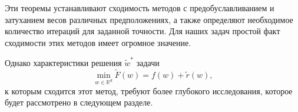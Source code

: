 Эти теоремы устанавливают сходимость методов с предобуславливанием и затуханием весов различных предположениях, а также определяют необходимое количество итераций для заданной точности. Для наших задач простой факт сходимости этих методов имеет огромное значение. 

Однако характеристики решения $\widetilde{w}^*$ задачи
\begin{equation} \label{F_tilde_problem}
	\min_{w \in \mathbb{R}^d} \tilde{F}(w) = f(w) + \tilde{r}(w),
\end{equation}
к которым сходится этот метод, требуют более глубокого исследования, которое будет рассмотрено в следующем разделе.